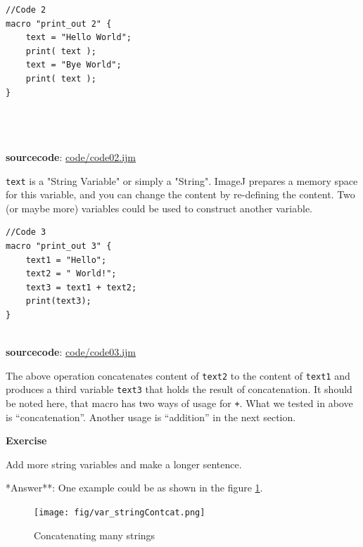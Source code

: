 \documentclass[11pt,a4paper,oneside]{report}
\newenvironment{indentexercise}[1]
{{\setlength{\leftmargin}{2em}}
\textbf{Exercise \thesubsection-#1}
\begin{list}{}
	\item
}
{\end{list}}
\newcommand{\ilcom}[1]{\texttt{\small#1}}
\begin{document}
\begin{lstlisting}
//Code 2
macro "print_out 2" {
	text = "Hello World";
	print( text );
	text = "Bye World";
	print( text );
}




\end{lstlisting}
\textbf{sourcecode}: \href{http://www.example.com/contents}{code/code02.ijm}

\ilcom{text} is a "String Variable" or simply a "String". 
ImageJ prepares a memory space for this variable, and you can change the content by re-defining the content. Two (or maybe more) variables could be used to construct another variable. 


\begin{lstlisting}
//Code 3
macro "print_out 3" {
	text1 = "Hello";
	text2 = " World!";
	text3 = text1 + text2;
	print(text3);
}


\end{lstlisting}
\textbf{sourcecode}: \href{http://www.example.com/contents}{code/code03.ijm}

The above operation concatenates content of \ilcom{text2} to the content of \ilcom{text1} and produces a third variable \ilcom{text3} that holds the result of concatenation. It should be noted here, that macro has two ways of usage for \ilcom{+}. What we tested in above is ``concatenation''. Another usage is ``addition'' in the next section. 

\begin{indentexercise}{1}

\item Add more string variables and make a longer sentence.\\

\item **Answer**: One example could be as shown in the figure \ref{var_stringconcat}. 

\end{indentexercise}

\begin{figure}[htbp]
\begin{center}
\texttt{[image: fig/var\_stringContcat.png]}
\caption{Concatenating many strings} \label{var_stringconcat}
\end{center}
\end{figure}
\end{document}
